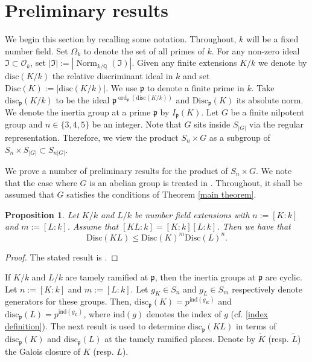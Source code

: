 \documentclass[11pt]{amsart}
\newtheorem{proposition}[theorem]{Proposition}
\newcommand{\Q}{\mathbb{Q}}
\newcommand{\cO}{\mathcal{O}}
\newcommand{\fp}{\mathfrak{p}}
\newcommand{\disc}{\mathrm{Disc}}
\newcommand{\rdisc}{\mathrm{disc}}
\newcommand{\ind}{\mathrm{ind}}
\newcommand{\op}[1]{\operatorname{#1}}
\numberwithin{equation}{section}
\begin{document}
\section{Preliminary results}\label{s 2}
\par We begin this section by recalling some notation. Throughout, $k$ will be a fixed number field. Set $\Omega_k$ to denote the set of all primes of $k$. For any non-zero ideal $\mathfrak{I}\subset \cO_k$, set $|\mathfrak{I}|:=|\op{Norm}_{k/\Q}(\mathfrak{I})|$. Given any finite extensions $K/k$ we denote by $\rdisc(K/k)$ the relative discriminant ideal in $k$ and set $\disc(K):=|\rdisc(K/k)|$. We use $\fp$ to denote a finite prime in $k$. Take $\rdisc_{\fp}(K/k)$ to be the ideal $\fp^{\op{ord}_{\fp}(\rdisc(K/k))}$ and $\disc_{\fp}(K)$ its absolute norm. We denote the inertia group at a prime $\fp$ by $I_{\fp}(K)$. Let $G$ be a finite nilpotent group and $n\in \{3,4,5\}$ be an integer. Note that $G$ sits inside $S_{|G|}$ via the regular representation. Therefore, we view the product $S_n \times G$ as a subgroup of $S_n\times S_{|G|}\subset S_{n|G|}$. 
\par We prove a number of preliminary results for the product of $S_n\times G$. We note that the case where $G$ is an abelian group is treated in \cite{Wang2020}. Throughout, it shall be assumed that $G$ satisfies the conditions of Theorem \ref{main theorem}. 
\begin{proposition}\label{disc_bound}
    Let $K/k$ and $L/k$ be number field extensions with $n:=[K:k]$ and $m:=[L:k]$. Assume that $[KL : k] = [K : k][L : k]$. Then we have that
\[
\disc(KL) \leq \disc(K)^m \disc(L)^n.
\]
\end{proposition}
\begin{proof}
    The stated result is \cite[Theorem 2.1]{Wang2020}.
\end{proof}
 If $K/k$ and $L/k$ are tamely ramified at $\fp$, then the inertia groups at $\fp$ are cyclic. Let $n:=[K:k]$ and $m:=[L:k]$. Let $g_K \in S_n$ and $g_L \in S_m$ respectively denote generators for these groups. Then, $\rdisc_{\fp}(K)=p^{\ind(g_K)}$ and $\rdisc_{\fp}(L)=p^{\ind(g_L)}$, where $\ind(g)$ denotes the index of $g$ (cf. \eqref{index definition}). The next result is used to determine $\rdisc_{\fp}(KL)$ in terms of $\rdisc_{\fp}(K)$ and $\rdisc_{\fp}(L)$ at the tamely ramified places. Denote by $\widetilde{K}$ (resp. $\widetilde{L}$) the Galois closure of $K$ (resp. $L$). 
\end{document}

